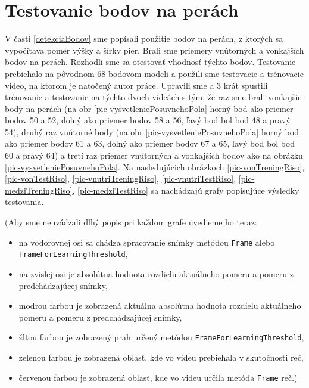 \section{Testovanie bodov na perách}\label{testBodyNaPerach}
V časti \ref{detekciaBodov} sme popísali použitie bodov na perách, z ktorých sa vypočítava pomer výšky a šírky pier. 
Brali sme priemery vnútorných a vonkajších bodov na perách. 
Rozhodli sme sa otestovať vhodnosť týchto bodov. 
Testovanie prebiehalo na pôvodnom 68 bodovom modeli a použili sme testovacie a trénovacie video, na ktorom je natočený autor práce.
Upravili sme a 3 krát spustili trénovanie a testovanie na týchto dvoch videách s tým, že raz sme brali vonkajšie body na perách (na obr \ref{pic-vysvetleniePosuvnehoPola} horný bod ako priemer bodov 50 a 52, dolný ako priemer bodov 58 a 56, ľavý bod bol bod 48 a pravý 54), druhý raz vnútorné body (na obr \ref{pic-vysvetleniePosuvnehoPola} horný bod ako priemer bodov 61 a 63, dolný ako priemer bodov 67 a 65, ľavý bod bol bod 60 a pravý 64) a tretí raz priemer vnútorných a vonkajších bodov ako na obrázku \ref{pic-vysvetleniePosuvnehoPola}.
Na nasledujúcich obrázkoch \ref{pic-vonTreningRiso}, \ref{pic-vonTestRiso}, \ref{pic-vnutriTreningRiso}, \ref{pic-vnutriTestRiso}, \ref{pic-medziTreningRiso}, \ref{pic-medziTestRiso} sa nachádzajú grafy popisujúce výsledky testovania.

(Aby sme neuvádzali dlhý popis pri každom grafe uvedieme ho teraz:
\begin{itemize}
\item na vodorovnej osi sa chádza spracovanie snímky metódou \texttt{Frame} alebo \texttt{Fra\-me\-For\-Lear\-ning\-Threshold},
\item na zvislej osi je absolútna hodnota rozdielu aktuálneho pomeru a pomeru z predchádzajúcej snímky,
\item modrou farbou je zobrazená aktuálna absolútna hodnota rozdielu aktuálneho pomeru a pomeru z predchádzajúcej snímky,
\item žltou farbou je zobrazený prah určený metódou \texttt{Fra\-me\-For\-Lear\-ning\-Threshold},
\item zelenou farbou je zobrazená oblasť, kde vo videu prebiehala v skutočnosti reč, 
\item červenou farbou je zobrazená oblasť, kde vo videu určila metóda \texttt{Frame} reč.)
\end{itemize}

